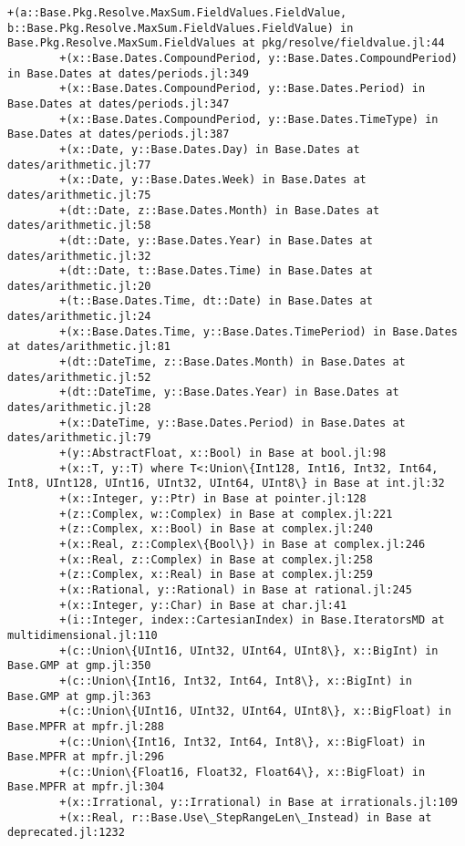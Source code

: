 \documentclass[11pt]{article}
\begin{document}
\begin{Verbatim}[commandchars=\\\{\}]
        +(a::Base.Pkg.Resolve.MaxSum.FieldValues.FieldValue, b::Base.Pkg.Resolve.MaxSum.FieldValues.FieldValue) in Base.Pkg.Resolve.MaxSum.FieldValues at pkg/resolve/fieldvalue.jl:44
        +(x::Base.Dates.CompoundPeriod, y::Base.Dates.CompoundPeriod) in Base.Dates at dates/periods.jl:349
        +(x::Base.Dates.CompoundPeriod, y::Base.Dates.Period) in Base.Dates at dates/periods.jl:347
        +(x::Base.Dates.CompoundPeriod, y::Base.Dates.TimeType) in Base.Dates at dates/periods.jl:387
        +(x::Date, y::Base.Dates.Day) in Base.Dates at dates/arithmetic.jl:77
        +(x::Date, y::Base.Dates.Week) in Base.Dates at dates/arithmetic.jl:75
        +(dt::Date, z::Base.Dates.Month) in Base.Dates at dates/arithmetic.jl:58
        +(dt::Date, y::Base.Dates.Year) in Base.Dates at dates/arithmetic.jl:32
        +(dt::Date, t::Base.Dates.Time) in Base.Dates at dates/arithmetic.jl:20
        +(t::Base.Dates.Time, dt::Date) in Base.Dates at dates/arithmetic.jl:24
        +(x::Base.Dates.Time, y::Base.Dates.TimePeriod) in Base.Dates at dates/arithmetic.jl:81
        +(dt::DateTime, z::Base.Dates.Month) in Base.Dates at dates/arithmetic.jl:52
        +(dt::DateTime, y::Base.Dates.Year) in Base.Dates at dates/arithmetic.jl:28
        +(x::DateTime, y::Base.Dates.Period) in Base.Dates at dates/arithmetic.jl:79
        +(y::AbstractFloat, x::Bool) in Base at bool.jl:98
        +(x::T, y::T) where T<:Union\{Int128, Int16, Int32, Int64, Int8, UInt128, UInt16, UInt32, UInt64, UInt8\} in Base at int.jl:32
        +(x::Integer, y::Ptr) in Base at pointer.jl:128
        +(z::Complex, w::Complex) in Base at complex.jl:221
        +(z::Complex, x::Bool) in Base at complex.jl:240
        +(x::Real, z::Complex\{Bool\}) in Base at complex.jl:246
        +(x::Real, z::Complex) in Base at complex.jl:258
        +(z::Complex, x::Real) in Base at complex.jl:259
        +(x::Rational, y::Rational) in Base at rational.jl:245
        +(x::Integer, y::Char) in Base at char.jl:41
        +(i::Integer, index::CartesianIndex) in Base.IteratorsMD at multidimensional.jl:110
        +(c::Union\{UInt16, UInt32, UInt64, UInt8\}, x::BigInt) in Base.GMP at gmp.jl:350
        +(c::Union\{Int16, Int32, Int64, Int8\}, x::BigInt) in Base.GMP at gmp.jl:363
        +(c::Union\{UInt16, UInt32, UInt64, UInt8\}, x::BigFloat) in Base.MPFR at mpfr.jl:288
        +(c::Union\{Int16, Int32, Int64, Int8\}, x::BigFloat) in Base.MPFR at mpfr.jl:296
        +(c::Union\{Float16, Float32, Float64\}, x::BigFloat) in Base.MPFR at mpfr.jl:304
        +(x::Irrational, y::Irrational) in Base at irrationals.jl:109
        +(x::Real, r::Base.Use\_StepRangeLen\_Instead) in Base at deprecated.jl:1232

\end{Verbatim}
\end{document}
